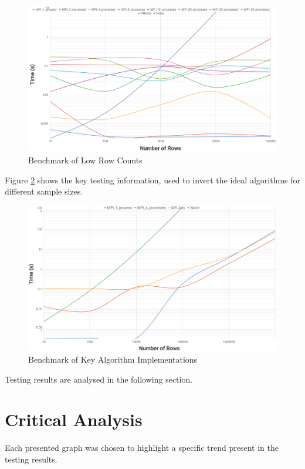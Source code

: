 \documentclass[10.5 pt, conference]{IEEEtran}
\begin{document}
\begin{figure}[h!]
\centering
\includegraphics[width=\textwidth]{graph1.png}
\centering
\caption{Benchmark of Low Row Counts}
\label{graph2}
\end{figure}

Figure \ref{graph3} shows the key testing information, used to invert the ideal algorithms for different sample sizes.

\begin{figure}[h!]
\centering
\includegraphics[width=\textwidth]{graph3.png}
\centering
\caption{Benchmark of Key Algorithm Implementations}
\label{graph3}
\end{figure}

Testing results are analysed in the following section.

\section{Critical Analysis}

Each presented graph was chosen to highlight a specific trend present in the testing results. 
\end{document}
